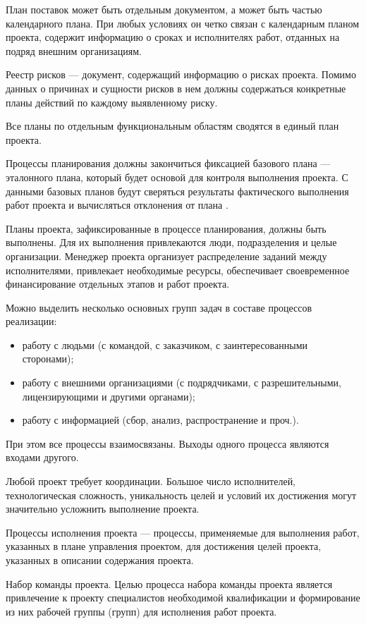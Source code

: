 План поставок может быть отдельным документом, а может быть частью календарного плана.
При любых условиях он четко связан с календарным планом проекта, содержит информацию о сроках и ис­полнителях работ, отданных на подряд внешним организациям.

Реестр рисков --- документ, содержащий информацию о рисках проекта.
Помимо данных о причинах и сущности рисков в нем долж­ны содержаться конкретные планы действий по каждому выявленно­му риску.

Все планы по отдельным функциональным областям сводятся в единый план проекта.

Процессы планирования должны закончиться фиксацией базово­го плана --- эталонного плана, который будет основой для контро­ля выполнения проекта.
С данными базовых планов будут сверяться результаты фактического выполнения работ проекта и вычисляться отклонения от плана \cite[174--175]{polkovnikov}.

Планы проекта, зафиксированные в процессе планирования, должны быть выполнены.
Для их выполнения привлекаются люди, подразде­ления и целые организации.
Менеджер проекта организует распре­деление заданий между исполнителями, привлекает необходимые ре­сурсы, обеспечивает своевременное финансирование отдельных этапов и работ проекта.

Можно выделить несколько основных групп задач в составе про­цессов реализации:
\begin{itemize}
	\item работу с людьми (с командой, с заказчиком, с заинтересованными сторонами);
	\item работу с внешними организациями (с подрядчиками, с разреши­тельными, лицензирующими и другими органами);
	\item работу с информацией (сбор, анализ, распространение и проч.).
\end{itemize}

При этом все процессы взаимосвязаны.
Выходы одного процесса являются входами другого.

Любой проект требует координации.
Большое число исполнителей, технологическая сложность, уникальность целей и условий их дости­жения могут значительно усложнить выполнение проекта.


Процессы исполнения проекта --- процессы, применяемые для выполнения работ, указанных в плане управления проектом, для достижения целей проекта, указанных в описании содержания проекта.

Набор команды проекта.
Целью процесса набора команды проекта является привлечение к проекту специалистов необходимой квалификации и формирование из них рабочей группы (групп) для исполнения работ проекта.

